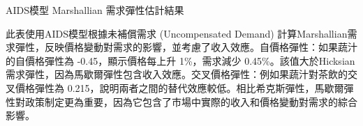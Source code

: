%     

\begin{table}[H]
    \caption{AIDS模型 Marshallian 需求彈性估計結果}
    \center
    \footnotesize
      \label{aids_marshall}
\end{table}
\vspace{-2em}
\begin{singlespace}
    \begin{footnotesize}
        \raggedright
         此表使用AIDS模型根據未補償需求 (Uncompensated Demand) 計算Marshallian需求彈性，反映價格變動對需求的影響，並考慮了收入效應。自價格彈性：如果蔬汁的自價格彈性為 -0.45，顯示價格每上升 1\%，需求減少 0.45\%。該值大於Hicksian需求彈性，因為馬歇爾彈性包含收入效應。交叉價格彈性：例如果蔬汁對茶飲的交叉價格彈性為 0.215，說明兩者之間的替代效應較低。相比希克斯彈性，馬歇爾彈性對政策制定更為重要，因為它包含了市場中實際的收入和價格變動對需求的綜合影響。
    \end{footnotesize}
\end{singlespace}

